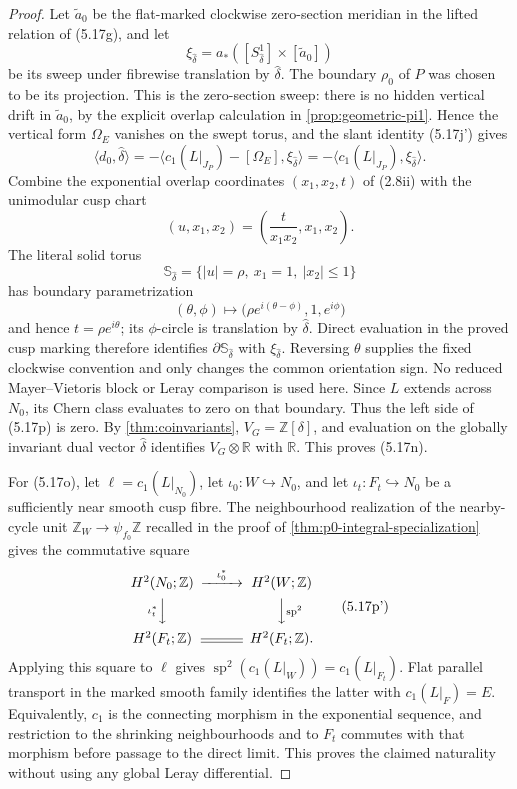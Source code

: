 \begin{proof}
Let $\widetilde a_0$ be the flat-marked clockwise zero-section meridian in
the lifted relation of (5.17g), and let
\[
 \xi_{\widehat\delta}
 =a_*([S^1_{\widehat\delta}]\times[\widetilde a_0])
\]
be its sweep under fibrewise translation by $\widehat\delta$.  The boundary
$\rho_0$ of $P$ was chosen to be its projection.  This is the zero-section
sweep: there is no hidden vertical drift in $\widetilde a_0$, by the
explicit overlap calculation in \cref{prop:geometric-pi1}.  Hence the
vertical form $\Omega_E$ vanishes on the swept torus, and the slant identity
(5.17j') gives
\[
 \langle d_0,\widehat\delta\rangle
 =-\langle c_1(L|_{J_P})-[\Omega_E],
          \xi_{\widehat\delta}\rangle
 =-\langle c_1(L|_{J_P}),\xi_{\widehat\delta}\rangle.
\tag{5.17p}
\]
Combine the exponential overlap coordinates $(x_1,x_2,t)$ of (2.8ii) with
the unimodular cusp chart
\[
 (u,x_1,x_2)=\left(\frac{t}{x_1x_2},x_1,x_2\right).
\]
The literal solid torus
\[
 \mathbb S_{\widehat\delta}
 =\{|u|=\rho,\ x_1=1,\ |x_2|\le1\}
\]
has boundary parametrization
\[
 (\theta,\phi)\longmapsto
 \bigl(\rho e^{i(\theta-\phi)},1,e^{i\phi}\bigr)
\tag{5.17p0}
\]
and hence $t=\rho e^{i\theta}$; its $\phi$-circle is translation by
$\widehat\delta$.  Direct evaluation in the proved cusp marking therefore
identifies $\partial\mathbb S_{\widehat\delta}$ with
$\xi_{\widehat\delta}$.  Reversing $\theta$ supplies the fixed clockwise
convention and only changes the common orientation sign.  No reduced
Mayer--Vietoris block or Leray comparison is used here.
Since $L$ extends across $N_0$, its Chern class evaluates to zero on that
boundary.  Thus the left side of (5.17p) is zero.  By
\cref{thm:coinvariants}, $V_G=\mathbb Z[\delta]$, and evaluation on the
globally invariant dual vector $\widehat\delta$ identifies
$V_G\otimes\mathbb R$ with $\mathbb R$.  This proves (5.17n).

For (5.17o), let $\ell=c_1(L|_{N_0})$, let
$\iota_0:W\hookrightarrow N_0$, and let
$\iota_t:F_t\hookrightarrow N_0$ be a sufficiently near smooth cusp fibre.
The neighbourhood realization of the nearby-cycle unit
$\mathbb Z_W\to\psi_{f_0}\mathbb Z$ recalled in the proof of
\cref{thm:p0-integral-specialization} gives the commutative square
\[
\begin{CD}
 H^2(N_0;\mathbb Z) @>{\iota_0^*}>> H^2(W;\mathbb Z)\\
 @V{\iota_t^*}VV @VV{\operatorname{sp}^2}V\\
 H^2(F_t;\mathbb Z) @= H^2(F_t;\mathbb Z).
\end{CD}
\tag{5.17p'}
\]
Applying this square to $\ell$ gives
$\operatorname{sp}^2(c_1(L|_W))=c_1(L|_{F_t})$.  Flat parallel transport
in the marked smooth family identifies the latter with $c_1(L|_F)=E$.
Equivalently, $c_1$ is the connecting morphism in the exponential sequence,
and restriction to the shrinking neighbourhoods and to $F_t$ commutes with
that morphism before passage to the direct limit.  This proves the claimed
naturality without using any global Leray differential.
\end{proof}

